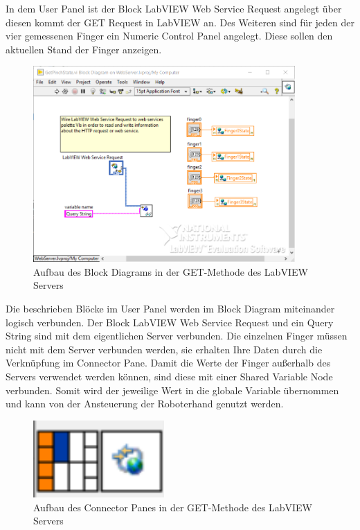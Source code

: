 \documentclass[a4paper,12pt,final]{article} %
\numberwithin{equation}{section} %
\numberwithin{figure}{section} %
\numberwithin{table}{section} %
\begin{document}
In dem User Panel ist der Block LabVIEW Web Service Request angelegt über diesen kommt der GET Request in LabVIEW an.
Des Weiteren sind für jeden der vier gemessenen Finger ein Numeric Control Panel angelegt. Diese sollen den aktuellen Stand der Finger anzeigen.
\begin{figure}[H]
	\begin{center}
		\includegraphics[width=10cm]{Bilder/BlockDiagram.png}
		\caption{Aufbau des Block Diagrams in der GET-Methode des LabVIEW Servers}
		\label{fig:LabVIEWBlockDia}
	\end{center}
\end{figure}
Die beschrieben Blöcke im User Panel werden im Block Diagram miteinander logisch verbunden.
Der Block LabVIEW Web Service Request und ein Query String sind mit dem eigentlichen Server verbunden. Die einzelnen Finger müssen nicht mit dem Server verbunden werden, sie erhalten Ihre Daten durch die Verknüpfung im Connector Pane.
Damit die Werte der Finger außerhalb des Servers verwendet werden können, sind diese mit einer Shared Variable Node verbunden. Somit wird der jeweilige Wert in die globale Variable übernommen und kann von der Ansteuerung der Roboterhand genutzt werden.  
\begin{figure}[H]
	\begin{center}
		\includegraphics[width=5cm]{Bilder/ConnectorPane.png}
		\caption{Aufbau des Connector Panes in der GET-Methode des LabVIEW Servers}
		\label{fig:LabVIEWConnectorPane}
	\end{center}
\end{figure}  
\end{document}
